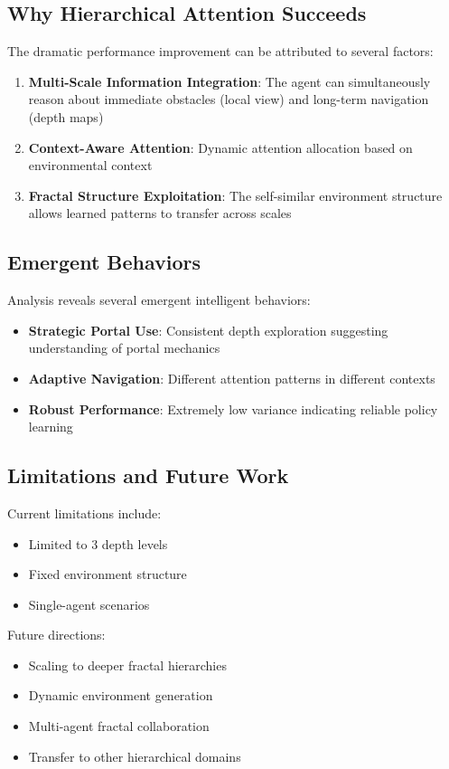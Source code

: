 \documentclass[11pt]{article}
\begin{document}
\subsection{Why Hierarchical Attention Succeeds}

The dramatic performance improvement can be attributed to several factors:

\begin{enumerate}
    \item \textbf{Multi-Scale Information Integration}: The agent can simultaneously reason about immediate obstacles (local view) and long-term navigation (depth maps)
    \item \textbf{Context-Aware Attention}: Dynamic attention allocation based on environmental context
    \item \textbf{Fractal Structure Exploitation}: The self-similar environment structure allows learned patterns to transfer across scales
\end{enumerate}

\subsection{Emergent Behaviors}

Analysis reveals several emergent intelligent behaviors:
\begin{itemize}
    \item \textbf{Strategic Portal Use}: Consistent depth exploration suggesting understanding of portal mechanics
    \item \textbf{Adaptive Navigation}: Different attention patterns in different contexts
    \item \textbf{Robust Performance}: Extremely low variance indicating reliable policy learning
\end{itemize}

\subsection{Limitations and Future Work}

Current limitations include:
\begin{itemize}
    \item Limited to 3 depth levels
    \item Fixed environment structure
    \item Single-agent scenarios
\end{itemize}

Future directions:
\begin{itemize}
    \item Scaling to deeper fractal hierarchies
    \item Dynamic environment generation
    \item Multi-agent fractal collaboration
    \item Transfer to other hierarchical domains
\end{itemize}
\end{document}
